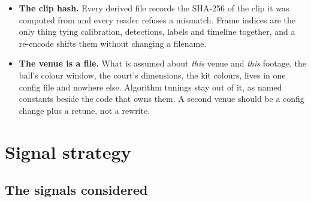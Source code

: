 \documentclass[10pt,a4paper]{article}
\begin{document}
\begin{itemize}
\item \textbf{The clip hash.} Every derived file records the SHA-256 of the clip it was
computed from and every reader refuses a mismatch. Frame indices are the only thing tying
calibration, detections, labels and timeline together, and a re-encode shifts them without
changing a filename.
\item \textbf{The venue is a file.} What is assumed about \emph{this} venue and \emph{this}
footage, the ball's colour window, the court's dimensions, the kit colours, lives in one
config file and nowhere else. Algorithm tunings stay out of it, as named constants beside the
code that owns them. A second venue should be a config change plus a retune, not a rewrite.
\end{itemize}

\section{Signal strategy}
\label{sec:signals}

\subsection{The signals considered}
\end{document}
